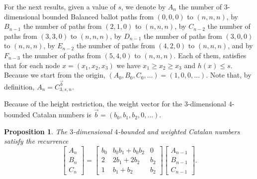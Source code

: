 \documentclass[12pt,notitlepage]{amsart}
\numberwithin{equation}{section}
\theoremstyle{thmstyleone}%
\newtheorem{proposition}[theorem]{Proposition}%
\theoremstyle{thmstyletwo}%
\theoremstyle{thmstylethree}%
\numberwithin{theorem}{section}
\numberwithin{equation}{section}
\begin{document}
For the next results, given a value of $s$, we denote by $A_n$ the number of $3$-dimensional bounded Balanced ballot paths from $(0,0,0)$ to $(n,n,n)$, by $B_{n-1}$ the number of paths from $(2,1,0)$ to $(n,n,n)$, by $C_{n-2}$ the number of paths from $(3,3,0)$ to $(n,n,n)$, by $D_{n-1}$ the number of paths from $(3,0,0)$ to $(n,n,n)$, by $E_{n-2}$ the number of paths from $(4,2,0)$ to $(n,n,n)$, and by $F_{n-3}$ the number of paths from $(5,4,0)$ to $(n,n,n)$. Each of them, satisfies that for each node $x = (x_1,x_2,x_3)$ we have $x_1 \geq x_2 \geq x_3$ and $h(x) \leq s$. Because we start from the origin, $(A_0,B_0,C_0, \ldots) = (1,0,0, \ldots)$. Note that, by definition, $A_n = C^{\vec{b}}_{3,s,n}.$

Because of the height restriction, the weight vector for the  $3$-dimensional $4$-bounded Catalan numbers is $\vec{b}=(b_0,b_1,b_2,0,\ldots)$.


\begin{proposition}
\label{proposition:4bound3d}
    The $3$-dimensional $4$-bounded and weighted Catalan numbers satisfy the recurrence
     \[\begin{bmatrix}
A_n \\
B_n \\
C_n
\end{bmatrix} =
\begin{bmatrix}
b_0 & b_0 b_1 + b_0 b_2 & 0 \\
2 & 2 b_1 + 2 b_2 & b_2 \\
1 & b_1 + b_2 & b_2
\end{bmatrix}
\begin{bmatrix}
A_{n-1} \\
B_{n-1} \\
C_{n-1}
\end{bmatrix}.
\]
\end{proposition}
\end{document}
